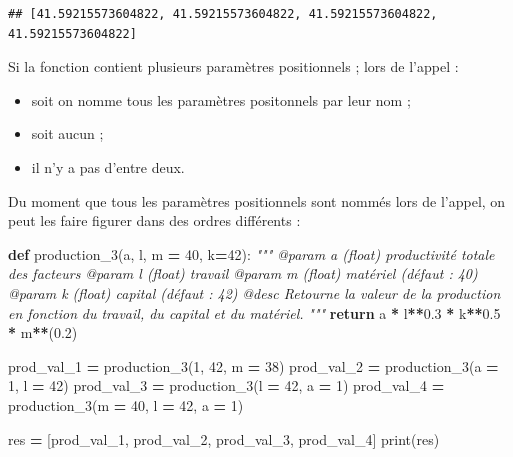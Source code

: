 \documentclass[12pt,]{book}
\newenvironment{Shaded}{\begin{snugshade}}{\end{snugshade}}
\newcommand{\KeywordTok}[1]{\textcolor[rgb]{0.13,0.29,0.53}{\textbf{#1}}}
\newcommand{\DecValTok}[1]{\textcolor[rgb]{0.00,0.00,0.81}{#1}}
\newcommand{\FloatTok}[1]{\textcolor[rgb]{0.00,0.00,0.81}{#1}}
\newcommand{\CommentTok}[1]{\textcolor[rgb]{0.56,0.35,0.01}{\textit{#1}}}
\newcommand{\ControlFlowTok}[1]{\textcolor[rgb]{0.13,0.29,0.53}{\textbf{#1}}}
\newcommand{\OperatorTok}[1]{\textcolor[rgb]{0.81,0.36,0.00}{\textbf{#1}}}
\newcommand{\BuiltInTok}[1]{#1}
\newcommand{\NormalTok}[1]{#1}
\providecommand{\tightlist}{%
  \setlength{\itemsep}{0pt}\setlength{\parskip}{0pt}}
\numberwithin{equation}{section}
\numberwithin{countremarque}{section}
\let\BeginKnitrBlock\begin \let\EndKnitrBlock\end
\begin{document}
\begin{lstlisting}
## [41.59215573604822, 41.59215573604822, 41.59215573604822, 41.59215573604822]
\end{lstlisting}

\BeginKnitrBlock{remarque}
Si la fonction contient plusieurs paramètres positionnels ; lors de
l'appel :

\begin{itemize}
\tightlist
\item
  soit on nomme tous les paramètres positonnels par leur nom ;
\item
  soit aucun ;
\item
  il n'y a pas d'entre deux.
\end{itemize}
\EndKnitrBlock{remarque}

Du moment que tous les paramètres positionnels sont nommés lors de
l'appel, on peut les faire figurer dans des ordres différents :

\begin{Shaded}
\begin{Highlighting}[]
\KeywordTok{def}\NormalTok{ production_3(a, l, m }\OperatorTok{=} \DecValTok{40}\NormalTok{, k}\OperatorTok{=}\DecValTok{42}\NormalTok{):}
  \CommentTok{"""}
\CommentTok{  @param a (float) productivité totale des facteurs}
\CommentTok{  @param l (float) travail}
\CommentTok{  @param m (float) matériel (défaut : 40)}
\CommentTok{  @param k (float) capital (défaut : 42)}
\CommentTok{  @desc Retourne la valeur de la production en fonction}
\CommentTok{    du travail, du capital et du matériel.}
\CommentTok{  """}
  \ControlFlowTok{return}\NormalTok{ a }\OperatorTok{*}\NormalTok{ l}\OperatorTok{**}\FloatTok{0.3} \OperatorTok{*}\NormalTok{ k}\OperatorTok{**}\FloatTok{0.5} \OperatorTok{*}\NormalTok{ m}\OperatorTok{**}\NormalTok{(}\FloatTok{0.2}\NormalTok{)}
  
\NormalTok{prod_val_1 }\OperatorTok{=}\NormalTok{ production_3(}\DecValTok{1}\NormalTok{, }\DecValTok{42}\NormalTok{, m }\OperatorTok{=} \DecValTok{38}\NormalTok{)}
\NormalTok{prod_val_2 }\OperatorTok{=}\NormalTok{ production_3(a }\OperatorTok{=} \DecValTok{1}\NormalTok{, l }\OperatorTok{=} \DecValTok{42}\NormalTok{)}
\NormalTok{prod_val_3 }\OperatorTok{=}\NormalTok{ production_3(l }\OperatorTok{=} \DecValTok{42}\NormalTok{, a }\OperatorTok{=} \DecValTok{1}\NormalTok{)}
\NormalTok{prod_val_4 }\OperatorTok{=}\NormalTok{ production_3(m }\OperatorTok{=} \DecValTok{40}\NormalTok{, l }\OperatorTok{=} \DecValTok{42}\NormalTok{, a }\OperatorTok{=} \DecValTok{1}\NormalTok{)}

\NormalTok{res }\OperatorTok{=}\NormalTok{ [prod_val_1, prod_val_2, prod_val_3, prod_val_4]}
\BuiltInTok{print}\NormalTok{(res)}
\end{Highlighting}
\end{Shaded}
\end{document}
